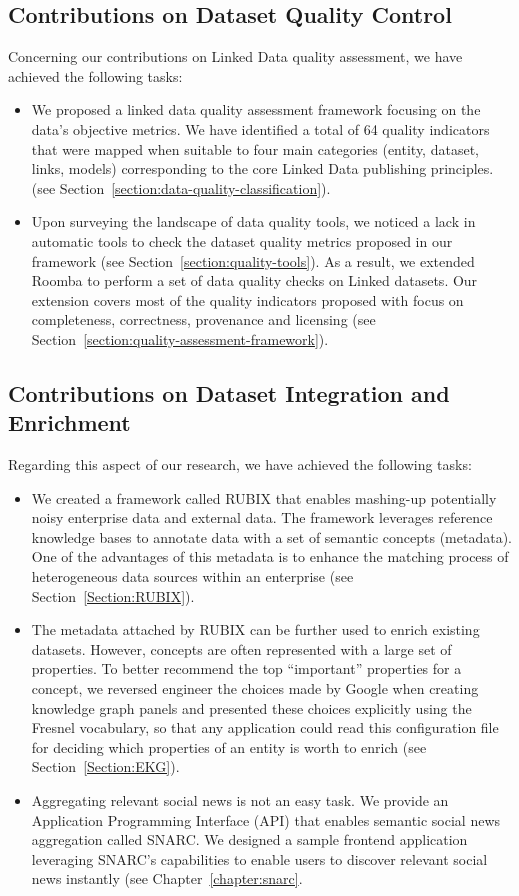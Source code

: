 \subsection{Contributions on Dataset Quality Control}
Concerning our contributions on Linked Data quality assessment, we have achieved the following tasks:
\begin{itemize}
	\item We proposed a linked data quality assessment framework focusing on the data's objective metrics. We have identified a total of 64 quality indicators that were mapped when suitable to four main categories (entity, dataset, links, models) corresponding to the core Linked Data publishing principles. (see Section~\ref{section:data-quality-classification}).
	\item Upon surveying the landscape of data quality tools, we noticed a lack in automatic tools to check the dataset quality metrics proposed in our framework (see Section~\ref{section:quality-tools}). As a result, we extended Roomba to perform a set of data quality checks on Linked datasets. Our extension covers most of the quality indicators proposed with focus on completeness, correctness, provenance and licensing (see Section~\ref{section:quality-assessment-framework}).
\end{itemize}

\subsection{Contributions on Dataset Integration and Enrichment}

Regarding this aspect of our research, we have achieved the following tasks:
\begin{itemize}
	\item We created a framework called RUBIX that enables mashing-up potentially noisy enterprise data and external data. The framework leverages reference knowledge bases to annotate data with a set of semantic concepts (metadata). One of the advantages of this metadata is to enhance the matching process of heterogeneous data sources within an enterprise (see Section~\ref{Section:RUBIX}).
	\item The metadata attached by RUBIX can be further used to enrich existing datasets. However, concepts are often represented with a large set of properties. To better recommend the top ``important'' properties for a concept, we reversed engineer the choices made by Google when creating knowledge graph panels and presented these choices explicitly using the Fresnel vocabulary, so that any application could read this configuration file for deciding which properties of an entity is worth to enrich (see Section~\ref{Section:EKG}).
	\item Aggregating relevant social news is not an easy task. We provide an Application Programming Interface (API) that enables semantic social news aggregation called SNARC. We designed a sample frontend application leveraging SNARC's capabilities to enable users to discover relevant social news instantly (see Chapter~\ref{chapter:snarc}.
\end{itemize}

